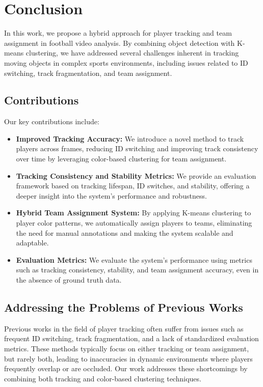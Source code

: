\section{Conclusion}

In this work, we propose a hybrid approach for player tracking and team assignment in football video analysis. By combining object detection with K-means clustering, we have addressed several challenges inherent in tracking moving objects in complex sports environments, including issues related to ID switching, track fragmentation, and team assignment.

\subsection{Contributions}

Our key contributions include:

\begin{itemize}
    \item \textbf{Improved Tracking Accuracy:} We introduce a novel method to track players across frames, reducing ID switching and improving track consistency over time by leveraging color-based clustering for team assignment.
    \item \textbf{Tracking Consistency and Stability Metrics:} We provide an evaluation framework based on tracking lifespan, ID switches, and stability, offering a deeper insight into the system's performance and robustness.
    \item \textbf{Hybrid Team Assignment System:} By applying K-means clustering to player color patterns, we automatically assign players to teams, eliminating the need for manual annotations and making the system scalable and adaptable.
    \item \textbf{Evaluation Metrics:} We evaluate the system's performance using metrics such as tracking consistency, stability, and team assignment accuracy, even in the absence of ground truth data.
\end{itemize}

\subsection{Addressing the Problems of Previous Works}

Previous works in the field of player tracking often suffer from issues such as frequent ID switching, track fragmentation, and a lack of standardized evaluation metrics. These methods typically focus on either tracking or team assignment, but rarely both, leading to inaccuracies in dynamic environments where players frequently overlap or are occluded. Our work addresses these shortcomings by combining both tracking and color-based clustering techniques.

